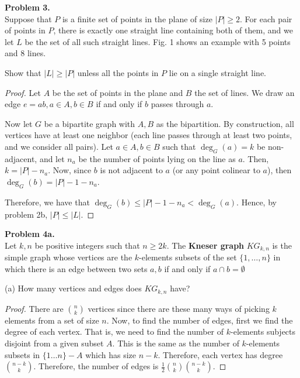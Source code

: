 \documentclass{article}
\newcommand{\set}[1]{\{#1\}}
\newenvironment{hwproof}[2]
{
    \textbf{Problem #1.}\\
    #2
    \begin{proof}
}{
    \end{proof}
    \newpage
}
\begin{document}
\begin{hwproof}
    {3}
    {
        Suppose that $P$ is a finite set of points in the plane of size $|P| \geq 2$. For each
        pair of points in $P$, there is exactly one straight line containing both of them,
        and we let $L$ be the set of all such straight lines. Fig. 1 shows an example with
        5 points and 8 lines.

        Show that $|L| \geq |P|$ unless all the points in $P$ lie on a single straight line.
    }
    Let $A$ be the set of points in the plane and $B$ the set of lines. We draw an
    edge $e = ab, a \in A, b \in B$ if and only if $b$ passes through $a$.

    Now let $G$ be a bipartite graph with $A, B$ as the bipartition. By construction,
    all vertices have at least one neighbor (each line passes through at least two
    points, and we consider all pairs). Let $a\in A, b \in B$ such that
    $\deg_G(a) = k$ be non-adjacent, and let $n_a$ be the number of points lying
    on the line as $a$. Then, $k = |P| - n_a$. Now, since $b$ is not adjacent
    to $a$ (or any point colinear to $a$), then $\deg_G(b) = |P| - 1 - n_a$.

    Therefore, we have that $\deg_G(b) \leq |P| - 1 - n_a < \deg_G(a)$. Hence,
    by problem 2b, $|P| \leq |L|$.
\end{hwproof}

\begin{hwproof}
    {4a}
    {
        Let $k, n$ be positive integers such that $n \geq 2k$. The \textbf{Kneser graph}
        $KG_{k,n}$ is the simple graph whose vertices are the $k$-elements subsets of
        the set $\set{1,\dots,n}$ in which there is an edge between two sets $a,b$
        if and only if $a\cap b = \emptyset$

        (a) How many vertices and edges does $KG_{k,n}$ have?
    }
    There are $\binom{n}{k}$ vertices since there are these many ways of picking $k$ elements
    from a set of size $n$. Now, to find the number of edges, first we find the degree of each
    vertex. That is, we need to find the number of $k$-elements subjects disjoint from a given
    subset $A$. This is the same as the number of $k$-elements subsets in
    $\set{1\dots n} - A$ which has size $n - k$. Therefore, each vertex has degree
    $\binom{n - k}{k}$. Therefore, the number of edges is
    $\frac{1}{2}\binom{n}{k}\binom{n - k}{k}$.
\end{hwproof}
\end{document}
